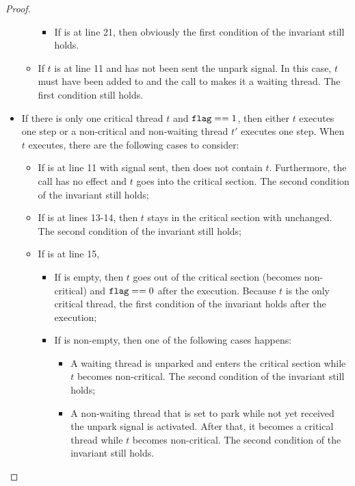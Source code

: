\documentclass{article}[10pt]
\begin{document}
\begin{proof}
\begin{itemize}
\begin{itemize}
\begin{itemize}
      \item If  is at line 21, then obviously the first
        condition of the invariant still holds.
      \end{itemize}

    \item 
      If $t$ is at line 11 and has not been sent the unpark signal.
      In this case, $t$ must have been added to \kq and the call to
      \kpark makes it a waiting thread. The first condition still
      holds.
    \end{itemize}
    
  \item If there is only one critical thread $t$ and $\text{\ttfamily flag} == 1$,
    then either $t$ executes one step or a non-critical and
    non-waiting thread $t'$ executes one step. When $t$ executes,
    there are the following cases to consider:
    \begin{itemize}
    \item If  is at line 11 with \kunpark signal sent, then
      \kq does not contain $t$. Furthermore, the call \kpark has no
      effect and $t$ goes into the critical section. The second
      condition of the invariant still holds;

    \item If  is at lines 13-14, then $t$ stays in the
      critical section with \kflag unchanged. The second condition of
      the invariant still holds;

    \item If  is at line 15, 
      \begin{itemize}
      \item If \kq is empty, then $t$ goes out of the critical section
        (becomes non-critical) and $\text{\ttfamily flag} == 0$ after the execution.
        Because $t$ is the only critical thread, the first
        condition of the invariant holds after the execution;
        
      \item If \kq is non-empty, then one of the following cases
        happens:
        \begin{itemize}
        \item A waiting thread is unparked and enters the critical
          section while $t$ becomes non-critical. The second condition
          of the invariant still holds;

        \item A non-waiting thread that is set to park while not yet
          received the unpark signal is activated. After that, it
          becomes a critical thread while $t$ becomes non-critical.
          The second condition of the invariant still holds.
        \end{itemize}


\end{itemize}
\end{itemize}
\end{itemize}
\end{proof}
\end{document}
